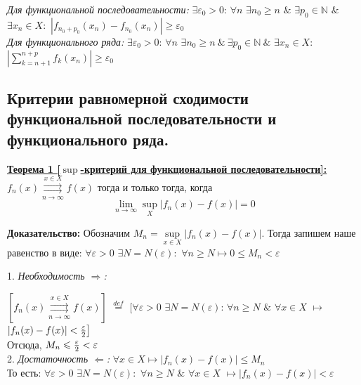 \documentclass[a4paper,12pt]{article} %
\renewcommand {\geq}{\geqslant}
\renewcommand {\leq}{\leqslant}
\begin{document}
\textit{Для функциональной последовательности:}
\newline
$\exists \varepsilon_0 > 0$: $\forall n$ $\exists n_0 \geq n$ $\& $ $\exists  p_0 \in \mathds{N}$ $\&$ $\exists x_n \in X:$ $|f_{n_0+p_0}(x_n) - f_{n_0}(x_n)| \geq \varepsilon_0$ 
\\[5mm] 
\textit{Для функционального ряда:}
\newline
$\exists \varepsilon_0 > 0$: $\forall n$ $\exists n_0 \geq n ~\&  ~\exists  p_0 \in \mathds{N} ~\& $ $\exists x_n \in X:$ $|\sum\limits_{k = n+1}^{n+p}f_k(x_n)| \geq \varepsilon_0$ 

\subsection{Критерии равномерной сходимости функциональной последовательности и функционального ряда.}

\underline{\textbf{Теорема 1 [$\sup$-критерий для функциональной последовательности]:}}\newline 
$f_n(x) \overset{x \in X}{\underset{n \rightarrow \infty}{\rightrightarrows}} f(x)$ тогда и только тогда, когда $$\lim\limits_{n \rightarrow \infty} \sup_{X}|f_n(x)-f(x)| = 0$$

\textbf{Доказательство:} 
\newline
Обозначим $M_n = \sup\limits_{x \in X}{|f_n(x)-f(x)|}$. \newline
Тогда запишем  наше равенство в виде: \newline
\hspace*{40mm}$\forall \varepsilon > 0$ $\exists N = N(\varepsilon):$ $\forall n \geq N \mapsto 0 \leq M_n < \varepsilon$ \newline

 1. \textit{Необходимость $\Rightarrow$:} \newline
 
 $[f_n(x) \overset{x \in X}{\underset{n \rightarrow \infty}{\rightrightarrows}} f(x)]$ $\stackrel{def}{=}$ $\big[\forall \varepsilon > 0 $  $\exists N = N(\varepsilon)$: $\forall n \geq N$  $\&$  $\forall x \in X$ $\longmapsto$ $|f_n(x) -f(x)| < {\varepsilon \over 2} \big]$
 \\[5 mm]
 Отсюда, $M_n \leq {\varepsilon \over 2 } < \varepsilon$
\\[ 5 mm]
2. \textit{Достаточность $\Leftarrow$:} \newline
\hspace*{5mm}$\forall x \in X \longmapsto |f_n(x)-f(x)|\leq M_n$ 
\\[ 5 mm]
То есть: \newline
\hspace*{20mm}$\forall \varepsilon > 0$  $\exists N = N(\varepsilon):$  $\forall n \geq N$ $\&$ $\forall x \in X$ $\longmapsto |f_n(x)-f(x)| < \varepsilon$ \newline
\end{document}
